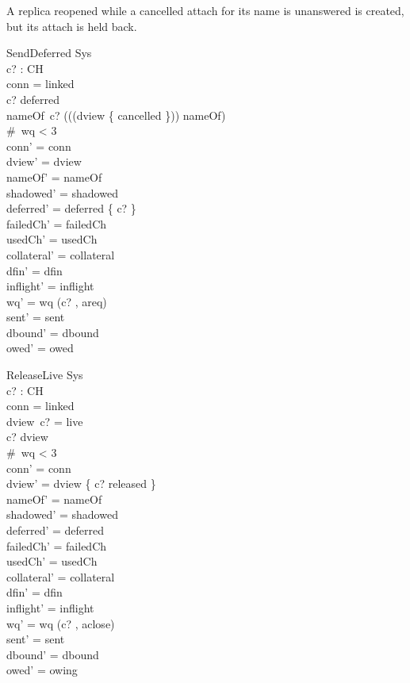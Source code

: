\documentclass[a4paper,10pt,fleqn]{article}
\begin{document}
A replica reopened while a cancelled attach for its name is unanswered is created, but its attach is held back.

\begin{schema}{SendDeferred}
  \Delta Sys \\
  c? : CH \\
\where
  conn = linked \\
  c? \in deferred \\
  nameOf~c? \notin \ran ((\dom (dview \rres \{ cancelled \})) \dres nameOf) \\
  \#~wq < 3 \\
  conn' = conn \\
  dview' = dview \\
  nameOf' = nameOf \\
  shadowed' = shadowed \\
  deferred' = deferred \setminus \{ c? \} \\
  failedCh' = failedCh \\
  usedCh' = usedCh \\
  collateral' = collateral \\
  dfin' = dfin \\
  inflight' = inflight \\
  wq' = wq \cat \langle (c? , areq) \rangle \\
  sent' = sent \\
  dbound' = dbound \\
  owed' = owed
\end{schema}

\begin{schema}{ReleaseLive}
  \Delta Sys \\
  c? : CH \\
\where
  conn = linked \\
  dview~c? = live \\
  c? \in \dom dview \\
  \#~wq < 3 \\
  conn' = conn \\
  dview' = dview \oplus \{ c? \mapsto released \} \\
  nameOf' = nameOf \\
  shadowed' = shadowed \\
  deferred' = deferred \\
  failedCh' = failedCh \\
  usedCh' = usedCh \\
  collateral' = collateral \\
  dfin' = dfin \\
  inflight' = inflight \\
  wq' = wq \cat \langle (c? , aclose) \rangle \\
  sent' = sent \\
  dbound' = dbound \\
  owed' = owing
\end{schema}
\end{document}
